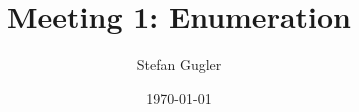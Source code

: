 \documentclass{beamer}
\title[Short title]{Meeting 1: Enumeration} %
\author{Stefan Gugler} %
\institute[UCLA] %
{
	Massachusetts Institute of Technology \\ %
	\medskip
	\textit{sgugler@mit.edu} %
}
\date{\today} %
\begin{document}
	
	\begin{frame}
	\titlepage %
\end{frame}




\end{document}
